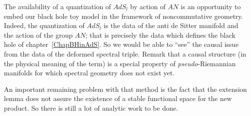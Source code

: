 The availability of a quantization of $AdS_l$ by action of $AN$ is an opportunity to embed our black hole toy model in the framework of noncommutative geometry. Indeed, the quantization of $AdS_l$ is the data of the anti de Sitter manifold and the action of the group $AN$; that is precisely the data which defines the black hole of chapter~\ref{ChapBHinAdS}. So we would be able to ``see'' the causal issue from the data of the deformed spectral triple. Remark that a causal structure (in the physical meaning of the term) is a special property of \emph{pseudo}-Riemannian manifolds for which spectral geometry does not exist yet.

An important remaining problem with that method is the fact that the extension lemma does not assure the existence of a stable functional space for the new product. So there is still a lot of analytic work to be done.
